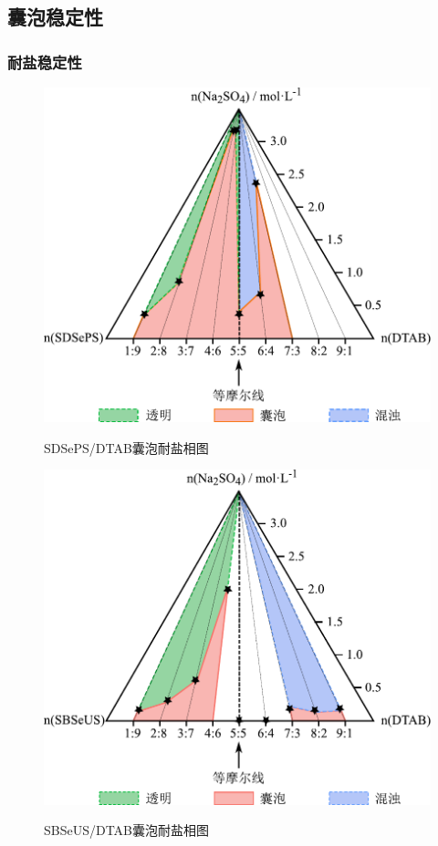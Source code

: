 \documentclass[bachelor,fandolfonts,replaceperiod]{jnuthesis}
\begin{document}
    \subsection{囊泡稳定性}
    \subsubsection{耐盐稳定性}
    \begin{figure}[htbp]
        \centering
        \includegraphics[width=0.52\linewidth]{figure/SDSePS-salt.pdf}\\
        \caption{SDSePS/DTAB囊泡耐盐相图}\label{fig:SDSePS-salt}
    \end{figure}
    
    \begin{figure}[htbp]
        \centering
        \includegraphics[width=0.52\linewidth]{figure/SBSeUS-salt.pdf}\\
        \caption{SBSeUS/DTAB囊泡耐盐相图}\label{fig:SBSeUS-salt}
    \end{figure}
\end{document}
